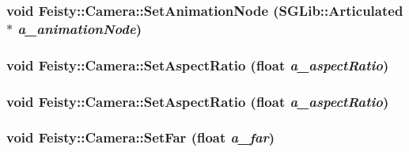 \label{class_feisty_1_1_camera_a7aca26cc73f4399edd7ede2ae1914cf8}
\hypertarget{class_feisty_1_1_camera_a7aca26cc73f4399edd7ede2ae1914cf8}{
\subsubsection[{SetAnimationNode}]{\setlength{\rightskip}{0pt plus 5cm}void Feisty::Camera::SetAnimationNode (SGLib::Articulated $\ast$ {\em a\_\-animationNode})}}
\label{class_feisty_1_1_camera_a7aca26cc73f4399edd7ede2ae1914cf8}
\hypertarget{class_feisty_1_1_camera_a38dcec7dc8214ebb274c71e2dcc2eeb3}{
\subsubsection[{SetAspectRatio}]{\setlength{\rightskip}{0pt plus 5cm}void Feisty::Camera::SetAspectRatio (float {\em a\_\-aspectRatio})}}
\label{class_feisty_1_1_camera_a38dcec7dc8214ebb274c71e2dcc2eeb3}
\hypertarget{class_feisty_1_1_camera_a38dcec7dc8214ebb274c71e2dcc2eeb3}{
\subsubsection[{SetAspectRatio}]{\setlength{\rightskip}{0pt plus 5cm}void Feisty::Camera::SetAspectRatio (float {\em a\_\-aspectRatio})}}
\label{class_feisty_1_1_camera_a38dcec7dc8214ebb274c71e2dcc2eeb3}
\hypertarget{class_feisty_1_1_camera_ad70999c56c819dcef588e7e93280ebce}{
\subsubsection[{SetFar}]{\setlength{\rightskip}{0pt plus 5cm}void Feisty::Camera::SetFar (float {\em a\_\-far})}}
